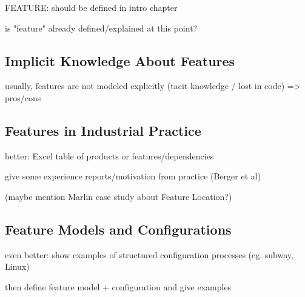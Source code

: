FEATURE: should be defined in intro chapter

is "feature" already defined/explained at this point?

\subsection{Implicit Knowledge About Features}

usually, features are not modeled explicitly (tacit knowledge / lost in code) => pros/cons

\subsection{Features in Industrial Practice}

better: Excel table of products or features/dependencies

give some experience reports/motivation from practice (Berger et al)

(maybe mention Marlin case study about Feature Location?)

\subsection{Feature Models and Configurations}

even better: show examples of structured configuration processes (eg. subway, Linux)

then define feature model + configuration and give examples

